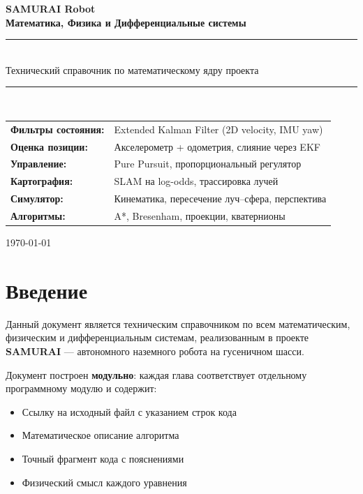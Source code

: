 \documentclass[12pt, a4paper, openany]{book}
\numberwithin{equation}{chapter}
\begin{document}
\begin{titlepage}
\centering
\vspace*{2cm}
{\Huge\bfseries SAMURAI Robot}\\[0.5cm]
{\Large\bfseries Математика, Физика и Дифференциальные системы}\\[1cm]
\rule{\textwidth}{1pt}\\[0.5cm]
{\large Технический справочник по математическому ядру проекта}\\[0.5cm]
\rule{\textwidth}{1pt}\\[2cm]

\begin{tabular}{ll}
\textbf{Фильтры состояния:} & Extended Kalman Filter (2D velocity, IMU yaw)\\
\textbf{Оценка позиции:} & Акселерометр + одометрия, слияние через EKF\\
\textbf{Управление:} & Pure Pursuit, пропорциональный регулятор\\
\textbf{Картография:} & SLAM на log-odds, трассировка лучей\\
\textbf{Симулятор:} & Кинематика, пересечение луч--сфера, перспектива\\
\textbf{Алгоритмы:} & A*, Bresenham, проекции, кватернионы\\
\end{tabular}

\vfill
{\large\today}
\end{titlepage}

\tableofcontents
\newpage

\chapter*{Введение}

Данный документ является техническим справочником по всем математическим,
физическим и дифференциальным системам, реализованным в проекте \textbf{SAMURAI} ---
автономного наземного робота на гусеничном шасси.

Документ построен \textbf{модульно}: каждая глава соответствует отдельному
программному модулю и содержит:
\begin{itemize}
  \item Ссылку на исходный файл с указанием строк кода
  \item Математическое описание алгоритма
  \item Точный фрагмент кода с пояснениями
  \item Физический смысл каждого уравнения
\end{itemize}
\end{document}
